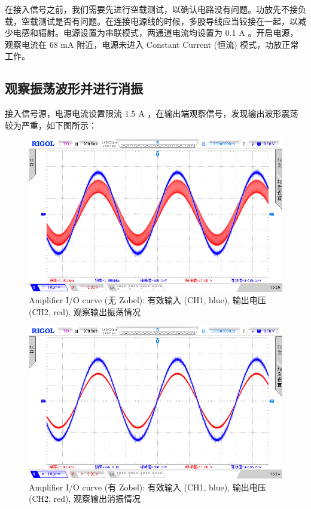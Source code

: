 \documentclass[UTF8]{article}
\begin{document}
在接入信号之前，我们需要先进行空载测试，以确认电路没有问题。功放先不接负载，空载测试是否有问题。在连接电源线的时候，多股导线应当铰接在一起，以减少电感和辐射。电源设置为串联模式，两通道电流均设置为 0.1 A 。开启电源，观察电流在 68 mA 附近，电源未进入 Constant Current (恒流) 模式，功放正常工作。


\subsection{观察振荡波形并进行消振}


接入信号源，电源电流设置限流 1.5 A ，在输出端观察信号，发现输出波形震荡较为严重，如下图所示：

\begin{figure}[H]\centering
    \includegraphics[width=\columnwidth]{LCE-03-功率放大器/assets/实验照片/观察输出是否振荡, 无 zobel (input 500mVpp 1kHz).png}
    \caption{Amplifier I/O curve (无 Zobel): 有效输入 (CH1, blue), 输出电压 (CH2, red), 观察输出振荡情况}
\end{figure}

\begin{figure}[H]\centering
    \includegraphics[width=\columnwidth]{LCE-03-功率放大器/assets/实验照片/观察输出是否振荡, 有 zobel (input 500mVpp 1kHz).png}
    \caption{Amplifier I/O curve (有 Zobel): 有效输入 (CH1, blue), 输出电压 (CH2, red), 观察输出消振情况}
\end{figure}
\end{document}
